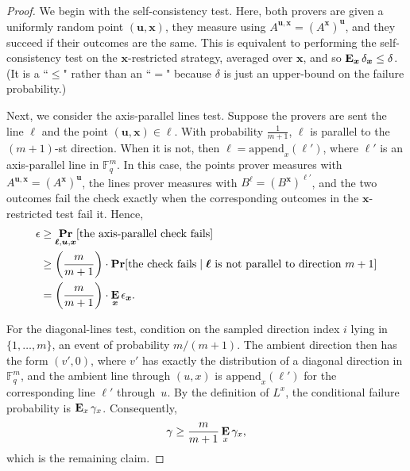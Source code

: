\documentclass[11pt]{article}
\theoremstyle{definition}
\renewcommand{\Pr}{\mathop{\bf Pr\/}}
\newcommand{\E}{\mathop{\bf E\/}}
\newcommand{\F}{\mathbb F}
\newcommand{\eps}{\epsilon}
\newcommand{\bell}{\boldsymbol{\ell}}
\newcommand{\bu}{\boldsymbol{u}}
\newcommand{\bx}{{\boldsymbol{x}}}
\begin{document}
\begin{proof}
We begin with the self-consistency test.
Here, both provers are given a uniformly random point $(\bu, \bx)$,
they measure using $A^{\bu, \bx} = (A^{\bx})^{\bu}$, and they succeed if their outcomes are the same.
This is equivalent to performing the self-consistency test on the $\bx$-restricted strategy, averaged over $\bx$,
and so $\E_{\bx} \delta_{\bx} \leq  \delta$. (It is a ``$\leq$" rather than an ``$=$" because $\delta$ is just an upper-bound on the failure probability.)

Next, we consider the axis-parallel lines test.
Suppose the provers are sent the line $\bell$ and the point $(\bu, \bx) \in \bell$.
With probability $\frac{1}{m+1}$, $\bell$ is parallel to the $(m+1)$-st direction.
When it is not, then $\bell = \mathrm{append}_x(\bell')$, where $\bell'$ is an axis-parallel line in $\F_q^m$.
In this case, the points prover measures with $A^{\bu, \bx} = (A^\bx)^{\bu}$,
the lines prover measures with $B^{\bell} = (B^{\bx})^{\bell'}$, and the two
outcomes fail the check exactly when the corresponding outcomes in the
$\bx$-restricted test fail it.  Hence,
\begin{align*}
\eps
&\geq \Pr_{\bell, \bu, \bx}[\text{the axis-parallel check fails}]\\
&\geq \left(\frac{m}{m+1}\right) \cdot
 \Pr[\text{the check fails}\mid \text{$\bell$ is not parallel to direction $m+1$}]\\
& =  \left(\frac{m}{m+1}\right) \cdot\E_{\bx} \eps_{\bx}.
\end{align*}

For the diagonal-lines test, condition on the sampled direction index
$i$ lying in $\{1,\ldots,m\}$, an event of probability $m/(m+1)$.
The ambient direction then has the form $(v',0)$, where $v'$ has exactly
the distribution of a diagonal direction in $\F_q^m$, and the ambient
line through $(u,x)$ is $\mathrm{append}_x(\ell')$ for the corresponding
line $\ell'$ through~$u$.  By the definition of $L^x$, the conditional
failure probability is $\E_x\gamma_x$.  Consequently,
\[
 \gamma\geq\frac{m}{m+1}\E_x\gamma_x,
\]
which is the remaining claim.
\end{proof}
\end{document}
